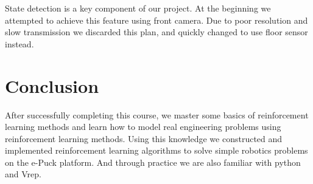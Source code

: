 \documentclass[a4paper, 11pt]{article} %
\begin{document}
State
detection is a key component of our project. At the beginning we attempted to
achieve this feature using front camera. Due to poor resolution and slow transmission
we discarded this plan, and quickly changed to use floor sensor instead.

\section{Conclusion}
After successfully completing this course, we master some basics of reinforcement
learning methods and learn how to model real engineering problems using reinforcement
learning methods. Using this knowledge we constructed and implemented reinforcement
learning algorithms to solve simple robotics problems on the e-Puck platform. And
through practice we are also familiar with python and Vrep.
\end{document}
